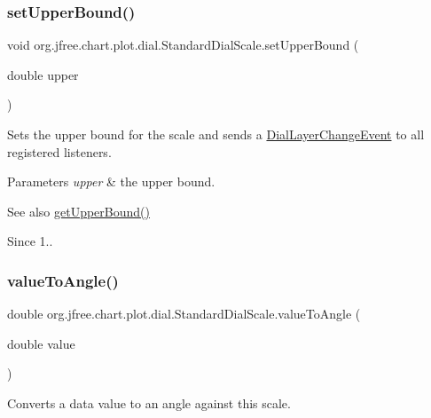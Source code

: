 \subsubsection{\texorpdfstring{set\+Upper\+Bound()}{setUpperBound()}}
{\footnotesize\ttfamily void org.\+jfree.\+chart.\+plot.\+dial.\+Standard\+Dial\+Scale.\+set\+Upper\+Bound (\begin{DoxyParamCaption}\item[{double}]{upper }\end{DoxyParamCaption})}

Sets the upper bound for the scale and sends a \mbox{\hyperlink{classorg_1_1jfree_1_1chart_1_1plot_1_1dial_1_1_dial_layer_change_event}{Dial\+Layer\+Change\+Event}} to all registered listeners.


\begin{DoxyParams}{Parameters}
{\em upper} & the upper bound.\\
\hline
\end{DoxyParams}
\begin{DoxySeeAlso}{See also}
\mbox{\hyperlink{classorg_1_1jfree_1_1chart_1_1plot_1_1dial_1_1_standard_dial_scale_aac8a93d9053c13224408742acfd00e08}{get\+Upper\+Bound()}}
\end{DoxySeeAlso}
\begin{DoxySince}{Since}
1.. 
\end{DoxySince}
\mbox{\label{classorg_1_1jfree_1_1chart_1_1plot_1_1dial_1_1_standard_dial_scale_a6ae0ce846561db45890b0c345e4e8d0e}} 
\subsubsection{\texorpdfstring{value\+To\+Angle()}{valueToAngle()}}
{\footnotesize\ttfamily double org.\+jfree.\+chart.\+plot.\+dial.\+Standard\+Dial\+Scale.\+value\+To\+Angle (\begin{DoxyParamCaption}\item[{double}]{value }\end{DoxyParamCaption})}

Converts a data value to an angle against this scale.


